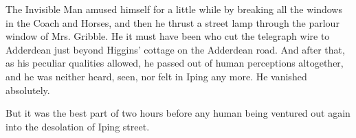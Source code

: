 The Invisible Man amused himself for a little while by breaking all the windows in the Coach and Horses, and then he thrust a street lamp through the parlour window of Mrs. Gribble. He it must have been who cut the telegraph wire to Adderdean just beyond Higgins’ cottage on the Adderdean road. And after that, as his peculiar qualities allowed, he passed out of human perceptions altogether, and he was neither heard, seen, nor felt in Iping any more. He vanished absolutely.

But it was the best part of two hours before any human being ventured out again into the desolation of Iping street.